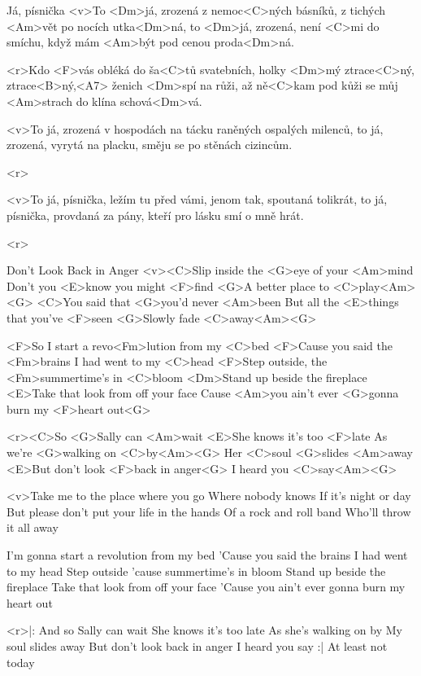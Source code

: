 \begin{song}{71}{Já, písnička}{}
	<v>To <Dm>já, zrozená z nemoc<C>ných básníků,
	z tichých <Am>vět po nocích utka<Dm>ná,
	to <Dm>já, zrozená, není <C>mi do smíchu,
	když mám <Am>být pod cenou proda<Dm>ná.

	<r>Kdo <F>vás obléká do ša<C>tů svatebních,
	holky <Dm>mý ztrace<C>ný, ztrace<B>ný,<A7>
	ženich <Dm>spí na růži, až ně<C>kam pod kůži
	se můj <Am>strach do klína schová<Dm>vá.

	<v>To já, zrozená v hospodách na tácku
	raněných ospalých milenců,
	to já, zrozená, vyrytá na placku,
	směju se po stěnách cizincům.

	<r>

	<v>To já, písnička, ležím tu před vámi,
	jenom tak, spoutaná tolikrát,
	to já, písnička, provdaná za pány,
	kteří pro lásku smí o mně hrát.

	<r>
\end{song}

\begin{song}[Oasis]{73}{Don't Look Back in Anger}{}
	<v><C>Slip inside the <G>eye of your <Am>mind
	Don't you <E>know you might <F>find
	<G>A better place to <C>play<Am><G>
	<C>You said that <G>you'd never <Am>been
	But all the <E>things that you've <F>seen
	<G>Slowly fade <C>away<Am><G>

	<F>So I start a revo<Fm>lution from my <C>bed
	<F>Cause you said the <Fm>brains I had went to my <C>head
	<F>Step outside, the <Fm>summertime's in <C>bloom
	<Dm>Stand up beside the fireplace
	<E>Take that look from off your face
	Cause <Am>you ain't ever <G>gonna burn my <F>heart out<G>

	<r><C>So <G>Sally can <Am>wait
	<E>She knows it's too <F>late
	As we're <G>walking on <C>by<Am><G>
	Her <C>soul <G>slides <Am>away
	<E>But don't look <F>back in anger<G>
	I heard you <C>say<Am><G>

	<v>Take me to the place where you go
	Where nobody knows
	If it's night or day
	But please don't put your life in the hands
	Of a rock and roll band
	Who'll throw it all away

	I'm gonna start a revolution from my bed
	'Cause you said the brains I had went to my head
	Step outside 'cause summertime's in bloom
	Stand up beside the fireplace
	Take that look from off your face
	'Cause you ain't ever gonna burn my heart out

	<r>|: And so Sally can wait
	She knows it's too late
	As she's walking on by
	My soul slides away
	But don't look back in anger
	I heard you say :|
	At least not today
\end{song}

